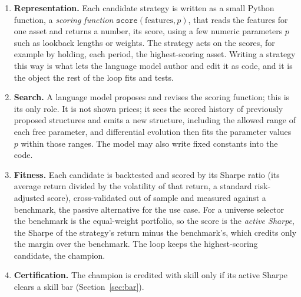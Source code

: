 \documentclass[11pt]{article}
\newcommand{\code}[1]{\texttt{#1}}
\begin{document}
\begin{enumerate}[leftmargin=1.4em]
\item \textbf{Representation.} Each candidate strategy is written as a small Python function, a
\emph{scoring function} $\code{score}(\text{features}, p)$, that reads the features for one asset and
returns a number, its score, using a few numeric parameters $p$ such as lookback lengths or weights.
The strategy acts on the scores, for example by holding, each period, the highest-scoring asset.
Writing a strategy this way is what lets the language model author and edit it as code, and it is the
object the rest of the loop fits and tests.
\item \textbf{Search.} A language model proposes and revises the scoring function; this is its only
role. It is not shown prices; it sees the scored history of previously proposed structures and emits a
new structure, including the allowed range of each free parameter, and differential evolution then fits
the parameter values $p$ within those ranges. The model may also write fixed constants into the code.
\item \textbf{Fitness.} Each candidate is backtested and scored by its Sharpe ratio (its average return
divided by the volatility of that return, a standard risk-adjusted score), cross-validated out of
sample and measured against a benchmark, the passive alternative for the use case. For a universe
selector the benchmark is the equal-weight portfolio, so the score is the \emph{active Sharpe}, the
Sharpe of the strategy's return minus the benchmark's, which credits only the margin over the benchmark.
The loop keeps the highest-scoring candidate, the champion.
\item \textbf{Certification.} The champion is credited with skill only if its active Sharpe clears a
skill bar (Section~\ref{sec:bar}).
\end{enumerate}
\end{document}
